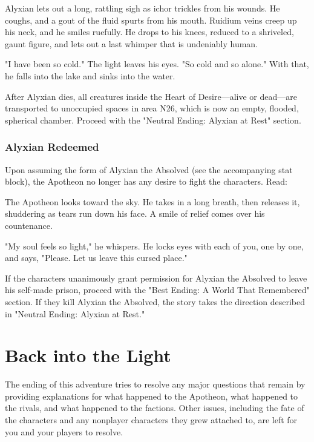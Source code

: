 \documentclass[10pt,a4paper,twoside,fancy,bg=print,twocolumn,openany,nodeprecatedcode]{dndbook}
\begin{document}
\begin{DndReadAloud}{}
Alyxian lets out a long, rattling sigh as ichor trickles from his wounds. He coughs, and a gout of the fluid spurts from his mouth. Ruidium veins creep up his neck, and he smiles ruefully. He drops to his knees, reduced to a shriveled, gaunt figure, and lets out a last whimper that is undeniably human.

"I have been so cold." The light leaves his eyes. "So cold and so alone." With that, he falls into the lake and sinks into the water.

\end{DndReadAloud}

After Alyxian dies, all creatures inside the Heart of Desire—alive or dead—are transported to unoccupied spaces in area N26, which is now an empty, flooded, spherical chamber. Proceed with the "Neutral Ending: Alyxian at Rest" section.

\subsubsection{Alyxian Redeemed}
Upon assuming the form of Alyxian the Absolved (see the accompanying stat block), the Apotheon no longer has any desire to fight the characters. Read:

\begin{DndReadAloud}{}
The Apotheon looks toward the sky. He takes in a long breath, then releases it, shuddering as tears run down his face. A smile of relief comes over his countenance.

"My soul feels so light," he whispers. He locks eyes with each of you, one by one, and says, "Please. Let us leave this cursed place."

\end{DndReadAloud}

If the characters unanimously grant permission for Alyxian the Absolved to leave his self-made prison, proceed with the "Best Ending: A World That Remembered" section. If they kill Alyxian the Absolved, the story takes the direction described in "Neutral Ending: Alyxian at Rest."

\section{Back into the Light}
The ending of this adventure tries to resolve any major questions that remain by providing explanations for what happened to the Apotheon, what happened to the rivals, and what happened to the factions. Other issues, including the fate of the characters and any nonplayer characters they grew attached to, are left for you and your players to resolve.
\end{document}
